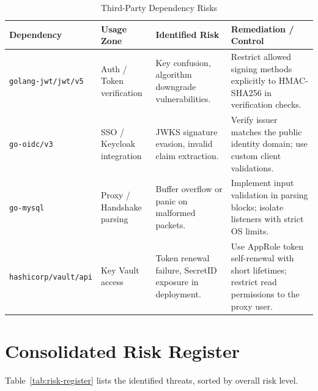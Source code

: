 \begin{table}[H]
\centering
\small
\renewcommand{\arraystretch}{1.2}
\begin{tabularx}{\textwidth}{l l X X}
\toprule
\textbf{Dependency} & \textbf{Usage Zone} & \textbf{Identified Risk} & \textbf{Remediation / Control} \\
\midrule
\texttt{golang-jwt/jwt/v5} & Auth / Token verification & Key confusion, algorithm downgrade vulnerabilities. & Restrict allowed signing methods explicitly to HMAC-SHA256 in verification checks. \\
\texttt{go-oidc/v3} & SSO / Keycloak integration & JWKS signature evasion, invalid claim extraction. & Verify issuer matches the public identity domain; use custom client validations. \\
\texttt{go-mysql} & Proxy / Handshake parsing & Buffer overflow or panic on malformed packets. & Implement input validation in parsing blocks; isolate listeners with strict OS limits. \\
\texttt{hashicorp/vault/api} & Key Vault access & Token renewal failure, SecretID exposure in deployment. & Use AppRole token self-renewal with short lifetimes; restrict read permissions to the proxy user. \\
\bottomrule
\end{tabularx}
\caption{Third-Party Dependency Risks}
\label{tab:deps}
\end{table}

\section{Consolidated Risk Register}

Table~\ref{tab:risk-register} lists the identified threats, sorted by overall risk level.

